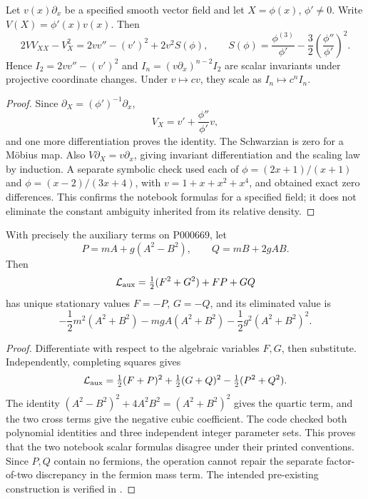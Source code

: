 \begin{proposition}\ours{}
Let \(v(x)\partial_x\) be a specified smooth vector field and let \(X=\phi(x)\), \(\phi'\ne0\). Write \(V(X)=\phi'(x)v(x)\). Then
\[
 2VV_{XX}-V_X^2
 =2vv''-(v')^2+2v^2S(\phi),\qquad
 S(\phi)=\frac{\phi^{(3)}}{\phi'}-
 \frac32\left(\frac{\phi''}{\phi'}\right)^2.
\]
Hence \(I_2=2vv''-(v')^2\) and \(I_n=(v\partial_x)^{n-2}I_2\) are scalar invariants under projective coordinate changes. Under \(v\mapsto cv\), they scale as \(I_n\mapsto c^nI_n\).
\end{proposition}
\begin{proof}
Since \(\partial_X=(\phi')^{-1}\partial_x\),
\[
 V_X=v'+\frac{\phi''}{\phi'}v,
\]
and one more differentiation proves the identity. The Schwarzian is zero for a Möbius map. Also \(V\partial_X=v\partial_x\), giving invariant differentiation and the scaling law by induction. A separate symbolic check used each of \(\phi=(2x+1)/(x+1)\) and \(\phi=(x-2)/(3x+4)\), with \(v=1+x+x^2+x^4\), and obtained exact zero differences. This confirms the notebook formulas for a specified field; it does not eliminate the constant ambiguity inherited from its relative density.
\end{proof}

\begin{proposition}\ours{}
With precisely the auxiliary terms on P000669, let
\[
 P=mA+g(A^2-B^2),\qquad Q=mB+2gAB.
\]
Then
\[
 \mathcal L_{\rm aux}=\tfrac12(F^2+G^2)+FP+GQ
\]
has unique stationary values \(F=-P\), \(G=-Q\), and its eliminated value is
\[
 -\frac12m^2(A^2+B^2)-mgA(A^2+B^2)
 -\frac12g^2(A^2+B^2)^2.
\]
\end{proposition}
\begin{proof}
Differentiate with respect to the algebraic variables \(F,G\), then substitute. Independently, completing squares gives
\[
 \mathcal L_{\rm aux}=\tfrac12(F+P)^2+\tfrac12(G+Q)^2
 -\tfrac12(P^2+Q^2).
\]
The identity
\((A^2-B^2)^2+4A^2B^2=(A^2+B^2)^2\)
gives the quartic term, and the two cross terms give the negative cubic coefficient. The code checked both polynomial identities and three independent integer parameter sets. This proves that the two notebook scalar formulas disagree under their printed conventions. Since \(P,Q\) contain no fermions, the operation cannot repair the separate factor-of-two discrepancy in the fermion mass term. The intended pre-existing construction is verified in \citet[\S~4(b)]{ogievetskymezincescu1975superfields}.
\end{proof}

